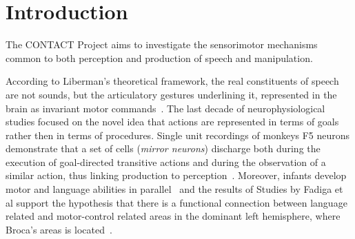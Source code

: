 \section{Introduction}
\label{ch:intro}
The CONTACT Project aims to investigate the
sensorimotor mechanisms common to both perception and production of speech and
manipulation.

According to Liberman's theoretical framework,
the real constituents of speech are not sounds, but the articulatory
gestures underlining it, represented in the brain as invariant motor 
commands~\citep{liberman.mattingly:1985}.
The last decade of neurophysiological studies focused on the novel idea that
actions are represented in terms of goals rather then in terms of
procedures. 
Single unit recordings of monkeys F5 neurons demonstrate that a set of cells
(\emph{mirror neurons}) discharge both during the execution of goal-directed 
transitive  actions and during the observation of a similar action, thus 
linking production to perception~\citep{rizzolatti.etal:1988,rizzolatti.etal:1996,rizzolatti.fadiga:1998}. 
Moreover, infants develop motor and language abilities in
parallel~\citep{lennenberg:1967,kandel.schwartz.jessel:2000} and the results of
Studies by Fadiga et al support
%
%
the hypothesis that there is a functional connection between language related
and motor-control related areas in the dominant left
hemisphere, where Broca's areas is located~\citep{fadiga.etal:PRESS}. 


